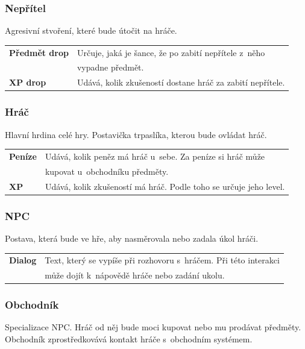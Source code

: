 \documentclass[12pt,a4paper]{article}
\begin{document}
\subsubsection{Nepřítel}
Agresivní stvoření, které bude útočit na hráče.\\[5pt]

\begin{tabular*}{0.87\textwidth}{ll}
  \bf Předmět drop & Určuje, jaká je šance, že po zabití nepřítele z~něho\\
                   & vypadne předmět. \\[7pt]
  \bf XP drop & Udává, kolik zkušeností dostane hráč za zabití nepřítele.\\[7pt]
\end{tabular*}

\subsubsection{Hráč}
Hlavní hrdina celé hry. Postavička trpaslíka, kterou bude ovládat hráč.\\[5pt]

\begin{tabular*}{0.87\textwidth}{ll}
  \bf Peníze & Udává, kolik peněz má hráč u~sebe. Za peníze si hráč může\\
             & kupovat u~obchodníku předměty. \\[7pt]
  \bf XP & Udává, kolik zkušeností má hráč. Podle toho se určuje jeho level.\\[7pt]
\end{tabular*}

\subsubsection{NPC}
Postava, která bude ve hře, aby nasměrovala nebo zadala úkol hráči. \\[5pt]

\begin{tabular*}{0.87\textwidth}{ll}
  \bf Dialog & Text, který se vypíše při rozhovoru s~hráčem. Při této interakci \\
             & může dojít k~nápovědě hráče nebo zadání ukolu. \\[7pt]
\end{tabular*}

\subsubsection{Obchodník}
Specializace NPC. Hráč od něj bude moci kupovat nebo mu prodávat předměty.
Obchodník zprostředkovává kontakt hráče s~obchodním systémem.
\end{document}

